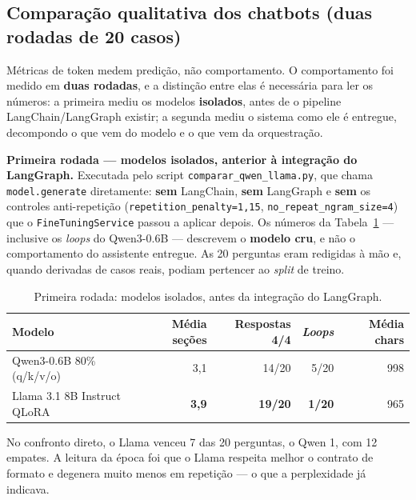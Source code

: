 \documentclass[12pt,a4paper]{article}
\begin{document}
\subsection{Comparação qualitativa dos chatbots (duas rodadas de 20 casos)}
\label{sec:20q}

Métricas de token medem predição, não comportamento. O comportamento foi medido
em \textbf{duas rodadas}, e a distinção entre elas é necessária para ler os
números: a primeira mediu os modelos \textbf{isolados}, antes de o pipeline
LangChain/LangGraph existir; a segunda mediu o sistema como ele é entregue,
decompondo o que vem do modelo e o que vem da orquestração.

\medskip
\noindent\textbf{Primeira rodada --- modelos isolados, anterior à integração do
LangGraph.} Executada pelo script \texttt{comparar\_qwen\_llama.py}, que chama
\texttt{model.}\allowbreak\texttt{generate} diretamente: \textbf{sem} LangChain,
\textbf{sem} LangGraph e \textbf{sem} os controles anti-repetição
(\texttt{repetition\_penalty=1,15}, \texttt{no\_repeat\_ngram\_size=4}) que o
\texttt{FineTuningService} passou a aplicar depois. Os números da
Tabela~\ref{tab:20q} --- inclusive os \emph{loops} do Qwen3-0.6B ---
descrevem o \textbf{modelo cru}, e não o comportamento do assistente entregue.
As 20 perguntas eram redigidas à mão e, quando derivadas de casos reais, podiam
pertencer ao \emph{split} de treino.

\begin{table}[htbp]
\centering
\caption{Primeira rodada: modelos isolados, antes da integração do LangGraph.}
\label{tab:20q}
\footnotesize
\begin{tabularx}{\textwidth}{X r r r r}
\toprule
\textbf{Modelo} & \textbf{Média seções} & \textbf{Respostas 4/4} & \textbf{\emph{Loops}} & \textbf{Média chars} \\
\midrule
Qwen3-0.6B 80\% (q/k/v/o)    & 3,1          & 14/20          & 5/20          & 998 \\
Llama 3.1 8B Instruct QLoRA  & \textbf{3,9} & \textbf{19/20} & \textbf{1/20} & 965 \\
\bottomrule
\end{tabularx}
\end{table}

No confronto direto, o Llama venceu 7 das 20 perguntas, o Qwen 1, com 12
empates. A leitura da época foi que o Llama respeita melhor o contrato de
formato e degenera muito menos em repetição --- o que a perplexidade já
indicava.
\end{document}

